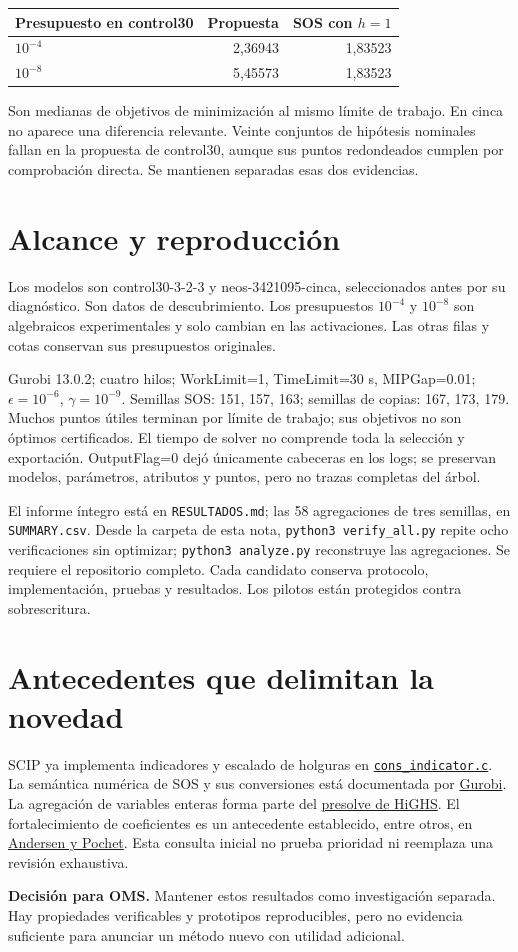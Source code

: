 \documentclass[10pt,a4paper]{article}
\begin{document}
\begin{center}
\begin{tabular}{lrr}
\toprule
Presupuesto en control30 & Propuesta & SOS con $h=1$\\\midrule
$10^{-4}$ & 2,36943 & 1,83523\\
$10^{-8}$ & 5,45573 & 1,83523\\\bottomrule
\end{tabular}
\end{center}
Son medianas de objetivos de minimización al mismo límite de trabajo.
En cinca no aparece una diferencia relevante. Veinte conjuntos de hipótesis
nominales fallan en la propuesta de control30, aunque sus puntos redondeados
cumplen por comprobación directa. Se mantienen separadas esas dos evidencias.

\section*{Alcance y reproducción}
Los modelos son control30-3-2-3 y neos-3421095-cinca, seleccionados antes por
su diagnóstico. Son datos de descubrimiento. Los presupuestos $10^{-4}$ y
$10^{-8}$ son algebraicos experimentales y solo cambian en las activaciones.
Las otras filas y cotas conservan sus presupuestos originales.

Gurobi 13.0.2; cuatro hilos; WorkLimit=1, TimeLimit=30 s, MIPGap=0.01;
$\epsilon=10^{-6}$, $\gamma=10^{-9}$. Semillas SOS: 151, 157, 163;
semillas de copias: 167, 173, 179. Muchos puntos útiles terminan por límite
de trabajo; sus objetivos no son óptimos certificados. El tiempo de solver
no comprende toda la selección y exportación. OutputFlag=0 dejó únicamente
cabeceras en los logs; se preservan modelos, parámetros, atributos y puntos,
pero no trazas completas del árbol.

El informe íntegro está en \texttt{RESULTADOS.md}; las 58 agregaciones de
tres semillas, en \texttt{SUMMARY.csv}. Desde la carpeta de esta nota,
\texttt{python3 verify\_all.py} repite ocho verificaciones sin optimizar;
\texttt{python3 analyze.py} reconstruye las agregaciones. Se requiere el
repositorio completo. Cada candidato conserva protocolo, implementación,
pruebas y resultados. Los pilotos están protegidos contra sobrescritura.

\section*{Antecedentes que delimitan la novedad}
SCIP ya implementa indicadores y escalado de holguras en
\href{https://raw.githubusercontent.com/scipopt/scip/master/src/scip/cons_indicator.c}{\texttt{cons\_indicator.c}}.
La semántica numérica de SOS y sus conversiones está documentada por
\href{https://docs.gurobi.com/projects/optimizer/en/12.0/concepts/modeling/constraints.html}{Gurobi}.
La agregación de variables enteras forma parte del
\href{https://github.com/ERGO-Code/HiGHS/blob/master/highs/presolve/HPresolve.cpp}{presolve de HiGHS}.
El fortalecimiento de coeficientes es un antecedente establecido, entre otros,
en \href{https://research.dial.uclouvain.be/entities/publication/03ea6bfe-7105-4d5c-a48a-47578c173bd1}{Andersen y Pochet}.
Esta consulta inicial no prueba prioridad ni reemplaza una revisión exhaustiva.

\textbf{Decisión para OMS.} Mantener estos resultados como investigación
separada. Hay propiedades verificables y prototipos reproducibles, pero no
evidencia suficiente para anunciar un método nuevo con utilidad adicional.
\end{document}
